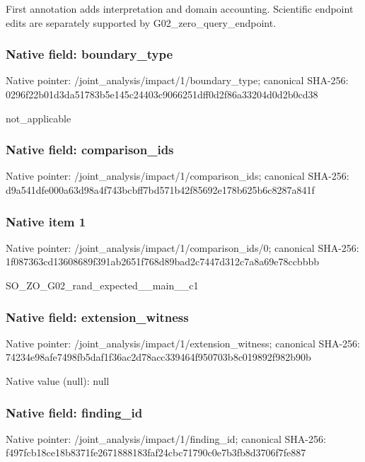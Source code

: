 \documentclass[10pt,a4paper]{article}
\begin{document}
\begingroup\raggedright\sloppy First annotation adds interpretation and domain accounting. Scientific endpoint edits are separately supported by G02\_\allowbreak{}zero\_\allowbreak{}query\_\allowbreak{}endpoint.\par\endgroup

\subsubsection{Native field: boundary\_\allowbreak{}type}
Native pointer: /joint\_\allowbreak{}analysis/impact/1/boundary\_\allowbreak{}type; canonical SHA-256: 0296f22b01d3da51783b5e145c24403c9066251dff0d2f86a33204d0d2b0cd38

\begingroup\raggedright\sloppy not\_\allowbreak{}applicable\par\endgroup

\subsubsection{Native field: comparison\_\allowbreak{}ids}
Native pointer: /joint\_\allowbreak{}analysis/impact/1/comparison\_\allowbreak{}ids; canonical SHA-256: d9a541dfe000a63d98a4f743bcbff7bd571b42f85692e178b625b6c8287a841f

\subsubsection{Native item 1}
Native pointer: /joint\_\allowbreak{}analysis/impact/1/comparison\_\allowbreak{}ids/0; canonical SHA-256: 1f087363cd13608689f391ab2651f768d89bad2c7447d312c7a8a69e78ccbbbb

\begingroup\raggedright\sloppy SO\_\allowbreak{}ZO\_\allowbreak{}G02\_\allowbreak{}rand\_\allowbreak{}expected\_\allowbreak{}\_\allowbreak{}main\_\allowbreak{}\_\allowbreak{}c1\par\endgroup

\subsubsection{Native field: extension\_\allowbreak{}witness}
Native pointer: /joint\_\allowbreak{}analysis/impact/1/extension\_\allowbreak{}witness; canonical SHA-256: 74234e98afe7498fb5daf1f36ac2d78acc339464f950703b8c019892f982b90b

Native value (null): null

\subsubsection{Native field: finding\_\allowbreak{}id}
Native pointer: /joint\_\allowbreak{}analysis/impact/1/finding\_\allowbreak{}id; canonical SHA-256: f497fcb18ce18b8371fe2671888183faf24cbc71790c0e7b3fb8d3706f7fe887
\end{document}

